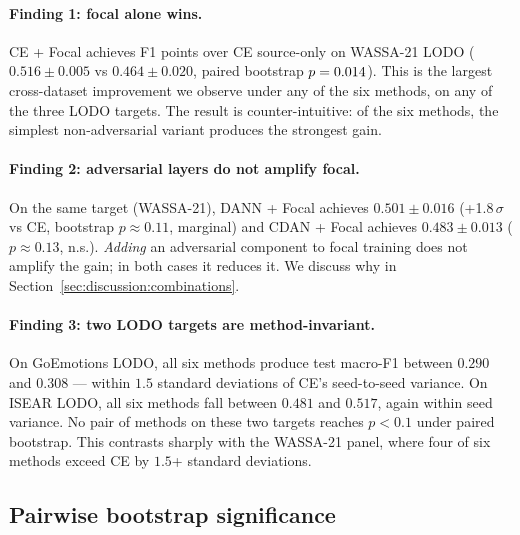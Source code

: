 \paragraph{Finding 1: focal alone wins.}
CE + Focal achieves \focalwassagain{} F1 points over CE source-only on
WASSA-21 LODO ($0.516 \pm 0.005$ vs $0.464 \pm 0.020$, paired bootstrap
$p = 0.014$). This is the largest cross-dataset improvement we
observe under any of the six methods, on any of the three LODO
targets. The result is counter-intuitive: of the six methods, the
simplest non-adversarial variant produces the strongest gain.

\paragraph{Finding 2: adversarial layers do not amplify focal.}
On the same target (WASSA-21), DANN + Focal achieves $0.501 \pm 0.016$
(+1.8\,$\sigma$ vs CE, bootstrap $p \approx 0.11$, marginal) and
CDAN + Focal achieves $0.483 \pm 0.013$ ($p \approx 0.13$, n.s.).
\emph{Adding} an adversarial component to focal training does not
amplify the gain; in both cases it reduces it. We discuss why in
Section~\ref{sec:discussion:combinations}.

\paragraph{Finding 3: two LODO targets are method-invariant.}
On GoEmotions LODO, all six methods produce test macro-F1 between
$0.290$ and $0.308$ — within $1.5$ standard deviations of CE's
seed-to-seed variance. On ISEAR LODO, all six methods fall between
$0.481$ and $0.517$, again within seed variance. No pair of methods on
these two targets reaches $p < 0.1$ under paired bootstrap. This
contrasts sharply with the WASSA-21 panel, where four of six methods
exceed CE by $1.5$+ standard deviations.

\subsection{Pairwise bootstrap significance}
\label{sec:results:bootstrap}

